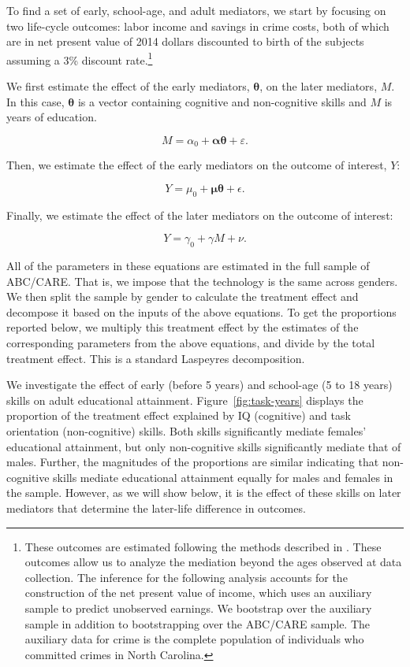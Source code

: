 To find a set of early, school-age, and adult mediators, we start by focusing on two life-cycle outcomes: labor income and savings in crime costs, both of which are in net present value of 2014 dollars discounted to birth of the subjects assuming a 3\% discount rate.\footnote{These outcomes are estimated following the methods described in \citet{Garcia_etal_2016_Comp_CBA_Unpublished}. These outcomes allow us to analyze the mediation beyond the ages observed at data collection. The inference for the following analysis accounts for the construction of the net present value of income, which uses an auxiliary sample to predict unobserved earnings. We bootstrap over the auxiliary sample in addition to bootstrapping over the ABC/CARE sample. The auxiliary data for crime is the complete population of individuals who committed crimes in North Carolina.}

We first estimate the effect of the early mediators, $\bm{\theta}$, on the later mediators, $M$. In this case, $\bm{\theta}$ is a vector containing cognitive and non-cognitive skills and $M$ is years of education.

\begin{equation}
	M = \alpha_0 +\bm{ \alpha} \bm{\theta} + \varepsilon.
\end{equation}

Then, we estimate the effect of the early mediators on the outcome of interest, $Y$:

\begin{equation}
	Y = \mu_0 + \bm{\mu} \bm{\theta} + \epsilon.
\end{equation}

Finally, we estimate the effect of the later mediators on the outcome of interest:

\begin{equation}
	Y = \gamma_0 + \gamma M + \nu. 
\end{equation}

All of the parameters in these equations are estimated in the full sample of ABC/CARE. That is, we impose that the technology is the same across genders. We then split the sample by gender to calculate the treatment effect and decompose it based on the inputs of the above equations. To get the proportions reported below, we multiply this treatment effect by the estimates of the corresponding parameters from the above equations, and divide by the total treatment effect. This is a standard Laspeyres decomposition.

We investigate the effect of early (before 5 years) and school-age (5 to 18 years) skills on adult educational attainment. Figure~\ref{fig:task-years} displays the proportion of the treatment effect explained by IQ (cognitive) and task orientation (non-cognitive) skills. Both skills significantly mediate females' educational attainment, but only non-cognitive skills significantly mediate that of males. Further, the magnitudes of the proportions are similar indicating that non-cognitive skills mediate educational attainment equally for males and females in the sample. However, as we will show below, it is the effect of these skills on later mediators that determine the later-life difference in outcomes.

